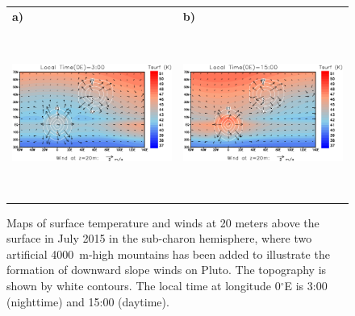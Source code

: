\begin{figure}
  \begin{center}
\renewcommand{\arraystretch}{0.2}
\renewcommand{\tabcolsep}{-0.0cm}
\begin{tabular}[h]{ll}
\hspace{-1cm}
{\bf a) } & {\bf b) } \\
\hspace{-1cm}
    \includegraphics[height=5.5cm,angle=-0,clip]{figures/maptsurf_wind_moun2_UT3.eps} &
    \includegraphics[height=5.5cm,angle=-0,clip]{figures/maptsurf_wind_moun2_UT15.eps}
\\
\end{tabular}
    \caption{
\label{fg:map_ts_mountain}
Maps of surface temperature and winds at 20 meters above the surface in
July 2015 in the sub-charon hemisphere, where two artificial 4000~m-high mountains has 
been added to illustrate the formation of downward slope winds on Pluto. 
The topography is shown by white contours. 
The local time at longitude 0$^\circ$E is 3:00 (nighttime) and 15:00 (daytime). 
    }%
  \end{center}
\end{figure}



